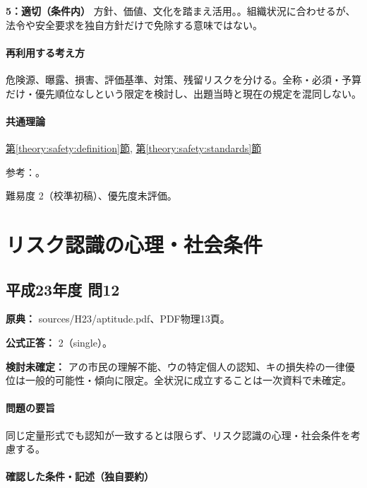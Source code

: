 \noindent\textbf{5：適切（条件内）} 方針、価値、文化を踏まえ活用。。組織状況に合わせるが、法令や安全要求を独自方針だけで免除する意味ではない。\par

\paragraph{再利用する考え方} 危険源、曝露、損害、評価基準、対策、残留リスクを分ける。全称・必須・予算だけ・優先順位なしという限定を検討し、出題当時と現在の規定を混同しない。

\paragraph{共通理論} \hyperref[theory:safety:definition]{第\ref*{theory:safety:definition}節}, \hyperref[theory:safety:standards]{第\ref*{theory:safety:standards}節}

\par 参考：\cite{saf_iso31000,saf_jis31010}。

\par 難易度 2（校準初稿）、優先度未評価。

\section{リスク認識の心理・社会条件}

\subsection{平成23年度 問12}
\label{q:h23-reg-apt-12}

\noindent\textbf{原典：} sources/H23/aptitude.pdf、PDF物理13頁。

\textbf{公式正答：} 2（single）。

\par\textbf{検討未確定：} アの市民の理解不能、ウの特定個人の認知、キの損失枠の一律優位は一般的可能性・傾向に限定。全状況に成立することは一次資料で未確定。

\paragraph{問題の要旨} 同じ定量形式でも認知が一致するとは限らず、リスク認識の心理・社会条件を考慮する。

\paragraph{確認した条件・記述（独自要約）}\mbox{}\par

